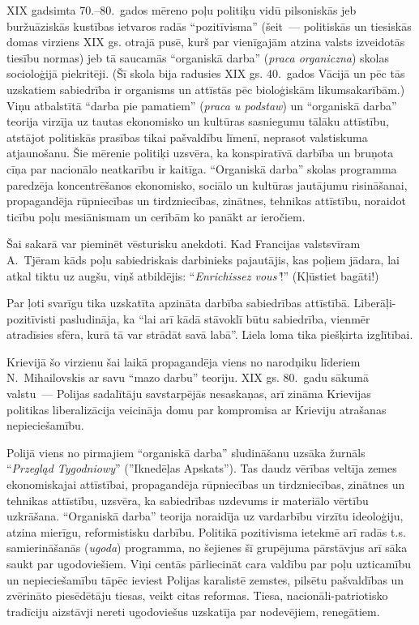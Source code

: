 \documentclass[twoside,a5paper,12pt,fleqn,openany]{extbook}
\newcommand{\pltxti}[1]{\textit{\textpolish{#1}}}
\newcommand{\frtxti}[1]{\textit{\textfrench{#1}}}
\begin{document}
XIX gadsimta 70.--80.~gados mēreno poļu politiķu vidū pilsoniskās jeb buržuāziskās kustības ietvaros radās ``pozitīvisma'' (šeit~--- politiskās un tiesiskās domas virziens XIX gs. otrajā pusē, kurš par vienīgajām atzina valsts izveidotās tiesību normas) jeb tā saucamās ``organiskā darba'' (\pltxti{praca organiczna}) skolas socioloģijā piekritēji. (Šī skola bija radusies XIX gs. 40.~gados Vācijā un pēc tās uzskatiem sabiedrība ir organisms un attīstās pēc bioloģiskām likumsakarībām.) Viņu atbalstītā ``darba pie pamatiem'' (\pltxti{praca u podstaw}) un ``organiskā darba'' teorija virzīja uz tautas ekonomisko un kultūras sasniegumu tālāku attīstību, atstājot politiskās prasības tikai pašvaldību līmenī, neprasot valstiskuma atjaunošanu. Šie mērenie politiķi uzsvēra, ka konspiratīvā darbība un bruņota cīņa par nacionālo neatkarību ir kaitīga. ``Organiskā darba'' skolas programma paredzēja koncentrēšanos ekonomisko, sociālo un kultūras jautājumu risināšanai, propagandēja rūpniecības un tirdzniecības, zinātnes, tehnikas attīstību, noraidot ticību poļu mesiānismam un cerībām ko panākt ar ieročiem.

Šai sakarā var pieminēt vēsturisku anekdoti. Kad Francijas valstsvīram A.~Tjēram kāds poļu sabiedriskais darbinieks pajautājis, kas poļiem jādara, lai atkal tiktu uz augšu, viņš atbildējis: ``\frtxti{Enrichissez vous'}!'' (Kļūstiet bagāti!)

Par ļoti svarīgu tika uzskatīta apzināta darbība sabiedrības attīstībā. Liberāļi-pozitīvisti pasludināja, ka ``lai arī kādā stāvoklī būtu sabiedrība, vienmēr atradīsies sfēra, kurā tā var strādāt savā labā''. Liela loma tika piešķirta izglītībai.

Krievijā šo virzienu šai laikā propagandēja viens no narodņiku līderiem N.~Mihailovskis ar savu ``mazo darbu'' teoriju. XIX gs. 80.~gadu sākumā valstu~--- Polijas sadalītāju savstarpējās nesaskaņas, arī zināma Krievijas politikas liberalizācija veicināja domu par kompromisa ar Krieviju atrašanas nepieciešamību.

Polijā viens no pirmajiem ``organiskā darba'' sludināšanu uzsāka žurnāls ``\pltxti{Przegląd Tygodniowy}'' (''Iknedēļas Apskats''). Tas daudz vērības veltīja zemes ekonomiskajai attīstībai, propagandēja rūpniecības un tirdzniecības, zinātnes un tehnikas attīstību, uzsvēra, ka sabiedrības uzdevums ir materiālo vērtību uzkrāšana. ``Organiskā darba'' teorija noraidīja uz vardarbību virzītu ideoloģiju, atzina mierīgu, reformistisku darbību. Politikā pozitivisma ietekmē arī radās t.s. samierināšanās (\pltxti{ugoda}) programma, no šejienes šī grupējuma pārstāvjus arī sāka saukt par ugodoviešiem. Viņi centās pārliecināt cara valdību par poļu uzticamību un nepieciešamību tāpēc ieviest Polijas karalistē zemstes, pilsētu pašvaldības un zvērināto piesēdētāju tiesas, veikt citas reformas. Tiesa, nacionāli-patriotisko tradīciju aizstāvji nereti ugodoviešus uzskatīja par nodevējiem, renegātiem.
\end{document}
